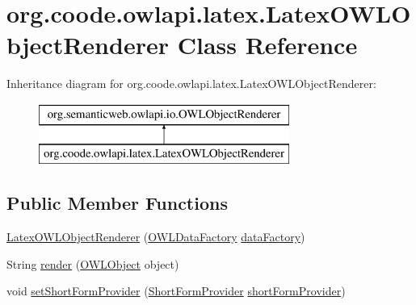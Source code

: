 \hypertarget{classorg_1_1coode_1_1owlapi_1_1latex_1_1_latex_o_w_l_object_renderer}{\section{org.\-coode.\-owlapi.\-latex.\-Latex\-O\-W\-L\-Object\-Renderer Class Reference}
\label{classorg_1_1coode_1_1owlapi_1_1latex_1_1_latex_o_w_l_object_renderer}
}
Inheritance diagram for org.\-coode.\-owlapi.\-latex.\-Latex\-O\-W\-L\-Object\-Renderer\-:\begin{figure}[H]
\begin{center}
\leavevmode
\includegraphics[height=2.000000cm]{classorg_1_1coode_1_1owlapi_1_1latex_1_1_latex_o_w_l_object_renderer}
\end{center}
\end{figure}
\subsection*{Public Member Functions}
\begin{DoxyCompactItemize}
\item 
\hyperlink{classorg_1_1coode_1_1owlapi_1_1latex_1_1_latex_o_w_l_object_renderer_ab1f58485e43334828f01cf817b8c4e6f}{Latex\-O\-W\-L\-Object\-Renderer} (\hyperlink{interfaceorg_1_1semanticweb_1_1owlapi_1_1model_1_1_o_w_l_data_factory}{O\-W\-L\-Data\-Factory} \hyperlink{classorg_1_1coode_1_1owlapi_1_1latex_1_1_latex_o_w_l_object_renderer_a4286edd6257b843af35ec94f2f9f102a}{data\-Factory})
\item 
String \hyperlink{classorg_1_1coode_1_1owlapi_1_1latex_1_1_latex_o_w_l_object_renderer_a88c787804779944fa024fbd7d60ce9b8}{render} (\hyperlink{interfaceorg_1_1semanticweb_1_1owlapi_1_1model_1_1_o_w_l_object}{O\-W\-L\-Object} object)
\item 
void \hyperlink{classorg_1_1coode_1_1owlapi_1_1latex_1_1_latex_o_w_l_object_renderer_ae231656a5312cb57fc22072cd14d57bb}{set\-Short\-Form\-Provider} (\hyperlink{interfaceorg_1_1semanticweb_1_1owlapi_1_1util_1_1_short_form_provider}{Short\-Form\-Provider} \hyperlink{classorg_1_1coode_1_1owlapi_1_1latex_1_1_latex_o_w_l_object_renderer_ac8f37219b1dc96bc0a4cda384f7aa86e}{short\-Form\-Provider})
\end{DoxyCompactItemize}
